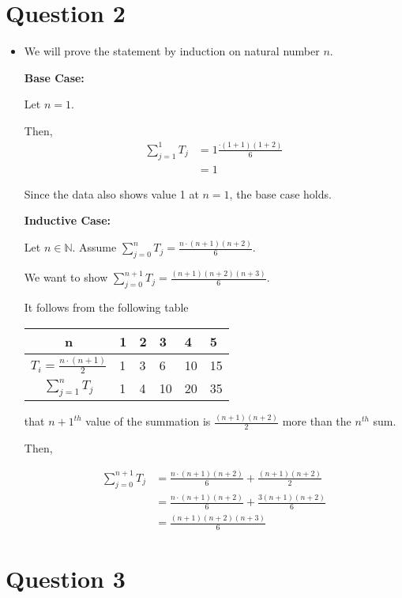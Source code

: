 \documentclass[12pt]{article}
\begin{document}
\section*{Question 2}
\begin{itemize}
    \item

    We will prove the statement by induction on natural number $n$.

    \bigskip

    \textbf{Base Case:}

    \bigskip

    Let $n = 1$.

    \bigskip

    Then,
    \setcounter{equation}{0}
    \begin{align}
        \sum\limits_{j=1}^{1} T_j &= 1 \frac{\cdot (1+1)(1+2)}{6}\\
        &= 1
    \end{align}

    \bigskip

    Since the data also shows value 1 at $n = 1$, the base case holds.

    \bigskip

    \textbf{Inductive Case:}

    \bigskip

    Let $n \in \mathbb{N}$. Assume $\sum\limits_{j=0}^n T_j = \frac{n \cdot (n+1)(n+2)}{6}$.

    \bigskip

    We want to show $\sum\limits_{j=0}^{n+1} T_j = \frac{(n+1)(n+2)(n+3)}{6}$.

    \bigskip

    It follows from the following table

    \begin{tabularx}{\textwidth}{|c|X|X|X|X|X|}
        \hline
        n & 1 & 2 & 3 & 4 & 5\\
        \hline
        $T_i = \frac{n \cdot (n+1)}{2}$ & 1 & 3 & 6 & 10 & 15\\
        \hline
        $\sum\limits_{j=1}^n T_j$ & 1 & 4 & 10 & 20 & 35\\
        \hline
    \end{tabularx}

    that $n+1^{th}$ value of the summation is $\frac{(n+1)(n+2)}{2}$ more than
    the $n^{th}$ sum.

    \bigskip

    Then,

    \begin{align}
        \sum\limits_{j=0}^{n+1} T_j &= \frac{n \cdot (n+1)(n+2)}{6} + \frac{(n+1)(n+2)}{2}\\
        &= \frac{n \cdot (n+1)(n+2)}{6} + \frac{3(n+1)(n+2)}{6}\\
        &= \frac{(n+1)(n+2)(n+3)}{6}
    \end{align}

\end{itemize}

\section*{Question 3}
\end{document}
